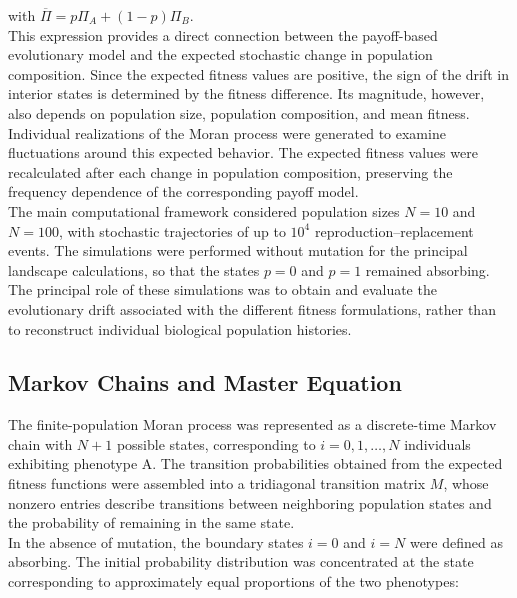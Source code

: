 with \(\overline{\Pi}=p\Pi_A+(1-p)\Pi_B\). \\ 

This expression provides a direct connection between the payoff-based evolutionary model and the expected stochastic change in population composition. Since the expected fitness values are positive, the sign of the drift in interior states is determined by the fitness difference. Its magnitude, however, also depends on population size, population composition, and mean fitness. \\ 

Individual realizations of the Moran process were generated to examine fluctuations around this expected behavior. The expected fitness values were recalculated after each change in population composition, preserving the frequency dependence of the corresponding payoff model. \\ 

The main computational framework considered population sizes \(N=10\) and \(N=100\), with stochastic trajectories of up to \(10^4\) reproduction--replacement events. The simulations were performed without mutation for the principal landscape calculations, so that the states \(p=0\) and \(p=1\) remained absorbing. \\ 

The principal role of these simulations was to obtain and evaluate the evolutionary drift associated with the different fitness formulations, rather than to reconstruct individual biological population histories. \\ 


\subsection{Markov Chains and Master Equation}
\label{sec:markov_methodology}

The finite-population Moran process was represented as a discrete-time Markov chain with \(N+1\) possible states, corresponding to \(i=0,1,\ldots,N\) individuals exhibiting phenotype A. The transition probabilities obtained from the expected fitness functions were assembled into a tridiagonal transition matrix \(M\), whose nonzero entries describe transitions between neighboring population states and the probability of remaining in the same state. \\ 

In the absence of mutation, the boundary states \(i=0\) and \(i=N\) were defined as absorbing. The initial probability distribution was concentrated at the state corresponding to approximately equal proportions of the two phenotypes:

